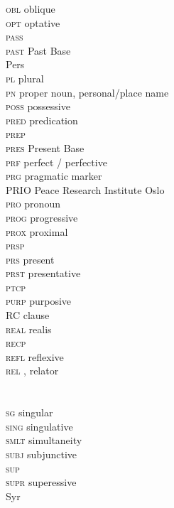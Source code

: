 \begin{refsection}
\begin{multicols}{2}
\begin{tabbing}
\textsc{obl} \> oblique \\
\textsc{opt} \> optative \\
\textsc{pass} \>  \\
\textsc{past} \>  Past Base \\
Pers \>  \\
\textsc{pl} \> plural \\
\textsc{pn} \> proper noun, personal/place name \\
\textsc{poss} \> possessive \\
\textsc{pred} \> predication \\
\textsc{prep} \>  \\
\textsc{pres} \>  Present Base \\
\textsc{prf} \> perfect / perfective \\
\textsc{prg} \> pragmatic marker \\
PRIO \> Peace Research Institute Oslo \\
\textsc{pro} \> pronoun \\
\textsc{prog} \> progressive \\
\textsc{prox} \> proximal \\
\textsc{prsp} \>  \\
\textsc{prs} \> present \\
\textsc{prst} \> presentative \\
\textsc{ptcp} \>  \\
\textsc{purp} \> purposive \\
RC \>  clause \\
\textsc{real} \> realis \\
\textsc{recp} \>  \\
\textsc{refl} \> reflexive \\
\textsc{rel} \> , relator \\
 \>  \\
 \>  \\
\textsc{sg} \> singular \\
\textsc{sing} \> singulative \\
\textsc{smlt} \> simultaneity \\
\textsc{subj} \> subjunctive \\
\textsc{sup} \>  \\
\textsc{supr} \> superessive \\
Syr \>  \\

\end{tabbing}
\end{multicols}
\end{refsection}
